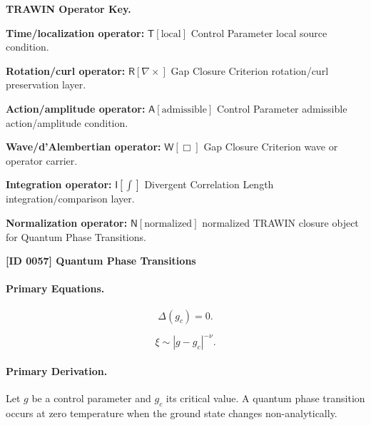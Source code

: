 \par\vspace{0.45\baselineskip}
\noindent\begin{minipage}[t]{\linewidth}
\begingroup
\small
\raggedright
\textbf{TRAWIN Operator Key.}\par
\noindent\textbf{Time/localization operator:} $\mathsf{T}\!\left[\mathrm{local}\right]$ Control Parameter local source condition.\par
\noindent\textbf{Rotation/curl operator:} $\mathsf{R}\!\left[\nabla\times\right]$ Gap Closure Criterion rotation/curl preservation layer.\par
\noindent\textbf{Action/amplitude operator:} $\mathsf{A}\!\left[\mathrm{admissible}\right]$ Control Parameter admissible action/amplitude condition.\par
\noindent\textbf{Wave/d'Alembertian operator:} $\mathsf{W}\!\left[\Box\right]$ Gap Closure Criterion wave or operator carrier.\par
\noindent\textbf{Integration operator:} $\mathsf{I}\!\left[\int\right]$ Divergent Correlation Length integration/comparison layer.\par
\noindent\textbf{Normalization operator:} $\mathsf{N}\!\left[\mathrm{normalized}\right]$ normalized TRAWIN closure object for Quantum Phase Transitions.\par
\endgroup
\end{minipage}

\clearpage
\noindent\textbf{[ID 0057] Quantum Phase Transitions}\par
\vspace{0.35em}
\paragraph{Primary Equations.}
\begin{equation}
\Delta(g_c)=0 .
\end{equation}

\begin{equation}
\xi \sim |g-g_c|^{-\nu}.
\end{equation}

\paragraph{Primary Derivation.}
Let $g$ be a control parameter and $g_c$ its critical value.  
A quantum phase transition occurs at zero temperature when the ground state changes non-analytically.

